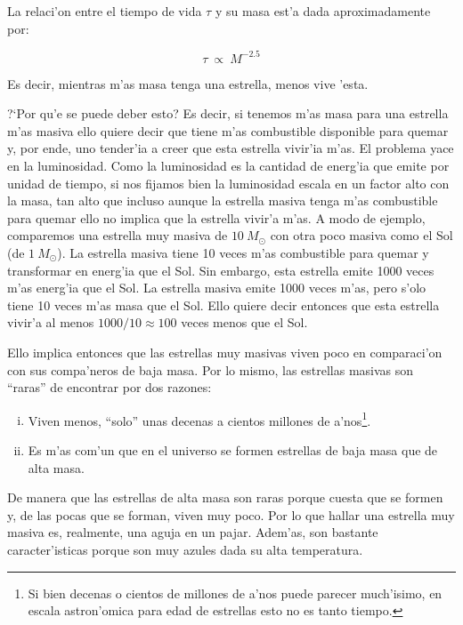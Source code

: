 \documentclass{article}
\begin{document}
\begin{enumerate}[a)]
La relaci'on entre el tiempo de vida $\tau$ y su masa est'a dada aproximadamente por:

\begin{equation}
\tau \ \propto \ M^{-2.5}
\end{equation}

Es decir, mientras m'as masa tenga una estrella, menos vive 'esta.

?`Por qu'e se puede deber esto? Es decir, si tenemos m'as masa para una estrella m'as masiva ello quiere decir que tiene m'as combustible disponible para quemar y, por ende, uno tender'ia a creer que esta estrella vivir'ia m'as. El problema yace en la luminosidad. Como la luminosidad es la cantidad de energ'ia que emite por unidad de tiempo, si nos fijamos bien la luminosidad escala en un factor alto con la masa, tan alto que incluso aunque la estrella masiva tenga m'as combustible para quemar ello no implica que la estrella vivir'a m'as. A modo de ejemplo, comparemos una estrella muy masiva de $10 \ M_\odot$ con otra poco masiva como el Sol (de $1 \ M_\odot$). La estrella masiva tiene 10 veces m'as combustible para quemar y transformar en energ'ia que el Sol. Sin embargo, esta estrella emite 1000 veces m'as energ'ia que el Sol. La estrella masiva emite 1000 veces m'as, pero s'olo tiene 10 veces m'as masa que el Sol. Ello quiere decir entonces que esta estrella vivir'a al menos $1000/10 \approx 100$ veces menos que el Sol.

\vspace{2mm}

Ello implica entonces que las estrellas muy masivas viven poco en comparaci'on con sus compa'neros de baja masa. Por lo mismo, las estrellas masivas son ``raras'' de encontrar por dos razones:

\begin{enumerate} [i)]
\item Viven menos, ``solo'' unas decenas a cientos millones de a'nos\footnote{Si bien decenas o cientos de millones de a'nos puede parecer much'isimo, en escala astron'omica para edad de estrellas esto no es tanto tiempo.}.

\item Es m'as com'un que en el universo se formen estrellas de baja masa que de alta masa.
\end{enumerate}

De manera que las estrellas de alta masa son raras porque cuesta que se formen y, de las pocas que se forman, viven muy poco. Por lo que hallar una estrella muy masiva es, realmente, una aguja en un pajar. Adem'as, son bastante caracter'isticas porque son muy azules dada su alta temperatura.


\end{enumerate}
\end{document}
